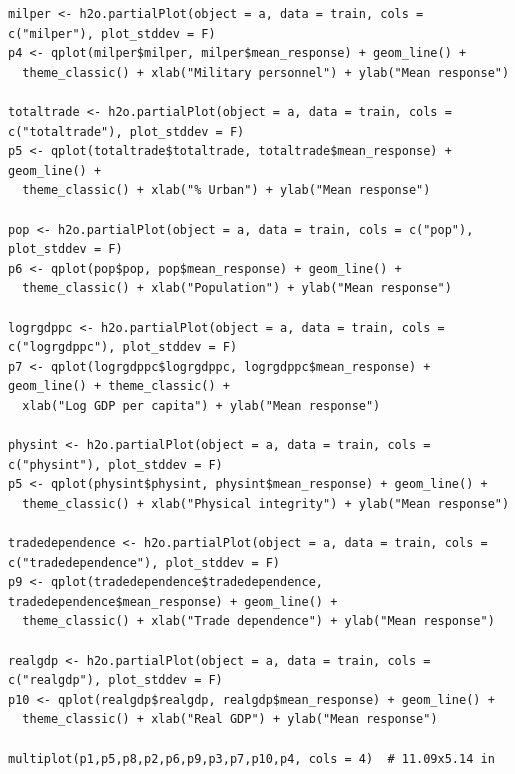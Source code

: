 \begin{verbatim}
milper <- h2o.partialPlot(object = a, data = train, cols = c("milper"), plot_stddev = F)
p4 <- qplot(milper$milper, milper$mean_response) + geom_line() +
  theme_classic() + xlab("Military personnel") + ylab("Mean response")

totaltrade <- h2o.partialPlot(object = a, data = train, cols = c("totaltrade"), plot_stddev = F)
p5 <- qplot(totaltrade$totaltrade, totaltrade$mean_response) + geom_line() +
  theme_classic() + xlab("% Urban") + ylab("Mean response")

pop <- h2o.partialPlot(object = a, data = train, cols = c("pop"), plot_stddev = F)
p6 <- qplot(pop$pop, pop$mean_response) + geom_line() +
  theme_classic() + xlab("Population") + ylab("Mean response")

logrgdppc <- h2o.partialPlot(object = a, data = train, cols = c("logrgdppc"), plot_stddev = F)
p7 <- qplot(logrgdppc$logrgdppc, logrgdppc$mean_response) + geom_line() + theme_classic() +
  xlab("Log GDP per capita") + ylab("Mean response")

physint <- h2o.partialPlot(object = a, data = train, cols = c("physint"), plot_stddev = F)
p5 <- qplot(physint$physint, physint$mean_response) + geom_line() +
  theme_classic() + xlab("Physical integrity") + ylab("Mean response")

tradedependence <- h2o.partialPlot(object = a, data = train, cols = c("tradedependence"), plot_stddev = F)
p9 <- qplot(tradedependence$tradedependence, tradedependence$mean_response) + geom_line() +
  theme_classic() + xlab("Trade dependence") + ylab("Mean response")

realgdp <- h2o.partialPlot(object = a, data = train, cols = c("realgdp"), plot_stddev = F)
p10 <- qplot(realgdp$realgdp, realgdp$mean_response) + geom_line() +
  theme_classic() + xlab("Real GDP") + ylab("Mean response")

multiplot(p1,p5,p8,p2,p6,p9,p3,p7,p10,p4, cols = 4)  # 11.09x5.14 in
\end{verbatim}

\doublespacing
\normalsize